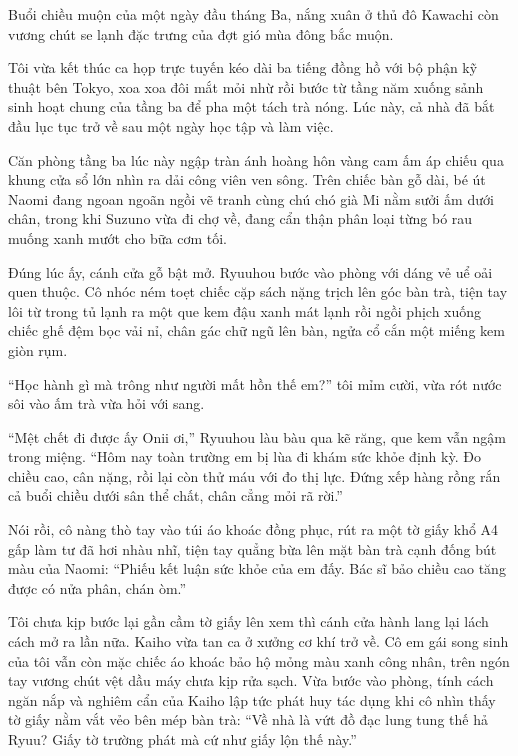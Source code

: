 \documentclass[../main.tex]{subfiles}
\begin{document}


Buổi chiều muộn của một ngày đầu tháng Ba, nắng xuân ở thủ đô Kawachi còn vương chút se lạnh đặc trưng của đợt gió mùa đông bắc muộn.

Tôi vừa kết thúc ca họp trực tuyến kéo dài ba tiếng đồng hồ với bộ phận kỹ thuật bên Tokyo, xoa xoa đôi mắt mỏi nhừ rồi bước từ tầng năm xuống sảnh sinh hoạt chung của tầng ba để pha một tách trà nóng. Lúc này, cả nhà đã bắt đầu lục tục trở về sau một ngày học tập và làm việc.

Căn phòng tầng ba lúc này ngập tràn ánh hoàng hôn vàng cam ấm áp chiếu qua khung cửa sổ lớn nhìn ra dải công viên ven sông. Trên chiếc bàn gỗ dài, bé út Naomi đang ngoan ngoãn ngồi vẽ tranh cùng chú chó già Mi nằm sưởi ấm dưới chân, trong khi Suzuno vừa đi chợ về, đang cẩn thận phân loại từng bó rau muống xanh mướt cho bữa cơm tối.

Đúng lúc ấy, cánh cửa gỗ bật mở. Ryuuhou bước vào phòng với dáng vẻ uể oải quen thuộc. Cô nhóc ném toẹt chiếc cặp sách nặng trịch lên góc bàn trà, tiện tay lôi từ trong tủ lạnh ra một que kem đậu xanh mát lạnh rồi ngồi phịch xuống chiếc ghế đệm bọc vải nỉ, chân gác chữ ngũ lên bàn, ngửa cổ cắn một miếng kem giòn rụm.

``Học hành gì mà trông như người mất hồn thế em?'' tôi mỉm cười, vừa rót nước sôi vào ấm trà vừa hỏi với sang.

``Mệt chết đi được ấy Onii ơi,'' Ryuuhou làu bàu qua kẽ răng, que kem vẫn ngậm trong miệng. ``Hôm nay toàn trường em bị lùa đi khám sức khỏe định kỳ. Đo chiều cao, cân nặng, rồi lại còn thử máu với đo thị lực. Đứng xếp hàng rồng rắn cả buổi chiều dưới sân thể chất, chân cẳng mỏi rã rời.''

Nói rồi, cô nàng thò tay vào túi áo khoác đồng phục, rút ra một tờ giấy khổ A4 gấp làm tư đã hơi nhàu nhĩ, tiện tay quẳng bừa lên mặt bàn trà cạnh đống bút màu của Naomi: ``Phiếu kết luận sức khỏe của em đấy. Bác sĩ bảo chiều cao tăng được có nửa phân, chán òm.''

Tôi chưa kịp bước lại gần cầm tờ giấy lên xem thì cánh cửa hành lang lại lách cách mở ra lần nữa. Kaiho vừa tan ca ở xưởng cơ khí trở về. Cô em gái song sinh của tôi vẫn còn mặc chiếc áo khoác bảo hộ mỏng màu xanh công nhân, trên ngón tay vương chút vệt dầu máy chưa kịp rửa sạch. Vừa bước vào phòng, tính cách ngăn nắp và nghiêm cẩn của Kaiho lập tức phát huy tác dụng khi cô nhìn thấy tờ giấy nằm vắt vẻo bên mép bàn trà: ``Về nhà là vứt đồ đạc lung tung thế hả Ryuu? Giấy tờ trường phát mà cứ như giấy lộn thế này.''
\end{document}
